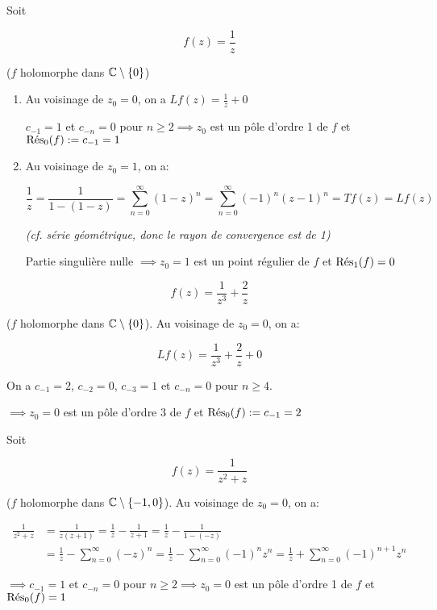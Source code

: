 \begin{example}[1]
    Soit
    
    \[f(z) = \frac{1}{z}\]
    
    ($f$ holomorphe dans $\Cx \setminus \{0\}$)
    
    \begin{enumerate}[label=\alph*)]
        \item 
        Au voisinage de $z_0 = 0$, on a $Lf(z) = \frac{1}{z} + 0$
        
        $c_{-1} = 1$ et $c_{-n} = 0$ pour $n \geq 2 \implies z_0$ est un pôle d'ordre 1 de $f$ et $\Res_0(f) := c_{-1} = 1$
        
        \item 
        Au voisinage de $z_0 = 1$, on a:
        
        \[ \frac{1}{z} = \frac{1}{1 - (1 - z)} = \sum_{n=0}^\infty (1-z)^n = \sum_{n=0}^\infty (-1)^n (z-1)^n = Tf(z) = Lf(z) \]
        
        \textit{(cf. série géométrique, donc le rayon de convergence est de 1)}
        
        Partie singulière nulle $\implies z_0 = 1$ est un point régulier de $f$ et $\Res_1(f) = 0$
    \end{enumerate}
\end{example}

\begin{example}[2]
    \[ f(z) = \frac{1}{z^3} + \frac{2}{z}\]
    
    ($f$ holomorphe dans $\Cx \setminus \{0\}$).
    Au voisinage de $z_0 = 0$, on a:
    
    \[ Lf(z) = \frac{1}{z^3} + \frac{2}{z} + 0 \]
    
    On a $c_{-1} = 2$, $c_{-2} = 0$, $c_{-3} = 1$ et $c_{-n} = 0$ pour $n \geq 4$.
    
    $\implies z_0 = 0$ est un pôle d'ordre 3 de $f$ et $\Res_0(f) := c_{-1} = 2$
\end{example}

\begin{example}[3]
    Soit
    
    \[ f(z) = \frac{1}{z^2 + z} \]
    
    ($f$ holomorphe dans $\Cx \setminus \{-1,0\}$).
    Au voisinage de $z_0 = 0$, on a:
    
    \begin{align*}
        \frac{1}{z^2 + z} &= \frac{1}{z(z+1)} = \frac{1}{z} - \frac{1}{z + 1} = \frac{1}{z} - \frac{1}{1 - (-z)}
        \\&= \frac{1}{z} - \sum_{n = 0}^\infty (-z)^n
        = \frac{1}{z} - \sum_{n = 0}^\infty (-1)^n z^n
        = \frac{1}{z} + \sum_{n = 0}^\infty (-1)^{n+1} z^n
    \end{align*}
    
    $\implies c_{-1} = 1$ et $c_{-n} = 0$ pour $n \geq 2 \implies z_0 = 0$ est un pôle d'ordre 1 de $f$ et $\Res_0(f) = 1$
\end{example}

